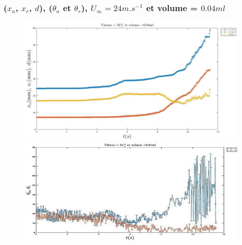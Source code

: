 \documentclass{beamer}
\begin{document}
\begin{frame}
	\frametitle{($x_{a}$, $x_{r}$, $d$), ($\theta_{a}$ et $\theta_{r}$), $U_{\infty}=24m.s^{-1}$ et volume = $0.04ml$}
\begin{figure}[!ht]
	\centering
	\begin{minipage}{0.5\linewidth}
		\includegraphics[width=\linewidth]{./image/v=24_vol=004_xaxrd_m.jpg}
	\end{minipage}
	\vfill
	\begin{minipage}{0.5\linewidth}
		\includegraphics[width=\linewidth]
		{./image/v=24_vol=004_oaor_m.jpg}
	\end{minipage}
\end{figure}
\end{frame}
\end{document}
